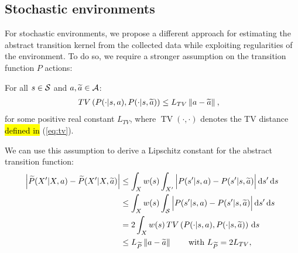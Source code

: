 \subsection{Stochastic environments}\label{sec:app2.3}
For stochastic environments, we propose a different approach for estimating the abstract transition kernel from the collected data while exploiting regularities of the environment. To do so, we require a stronger assumption on the transition function $P$ \wrt actions:
%
\begin{assumption}\label{ass:lipmdp2}
	For all $s\in\mathcal{S}$ and $a,\widetilde{a}\in\mathcal{A}$:
	\begin{align}
	&\mathop{TV}\left(P(\cdot|s,a), P(\cdot| s,\widetilde{a})\right) \leq L_{TV}\left\|a - \widetilde{a}\right\|_{},
	\end{align}
	for some positive real constant $L_{TV}$, where $\mathop{TV}(\cdot,\cdot)$ denotes the \acf{TV} distance \hl{defined in} (\ref{eq:tv}).
\end{assumption}
%
\noindent We can use this assumption to derive a Lipschitz constant for the abstract transition function:
\begin{align}
\Big|\widetilde{P}(X'|X,a) - \widetilde{P}(X'|X,\widetilde{a})\Big| &\leq \int_{X} w(s) \int_{X'} \Big|P(s'|s,a) - P(s'|s,\widetilde{a})\Big| \,\mathrm{d} s' \,\mathrm{d} s \nonumber\\
&\leq \int_{X}w(s)\int_{\mathcal{S}} \Big|P(s'|s,a) - P(s'|s,\widetilde{a})\Big| \,\mathrm{d} s' \,\mathrm{d} s \label{p:24} \\
&= 2\int_{X}w(s)\mathop{TV}\left(P(\cdot|s,a), P(\cdot|s,\widetilde{a})\right)\,\mathrm{d} s\label{p:33}\\
&\leq L_{\widetilde{P}}\left\|a-\widetilde{a}\right\|_{}\qquad\text{with $L_{\widetilde{P}}=2L_{TV}$}\label{p:27},
\end{align}
